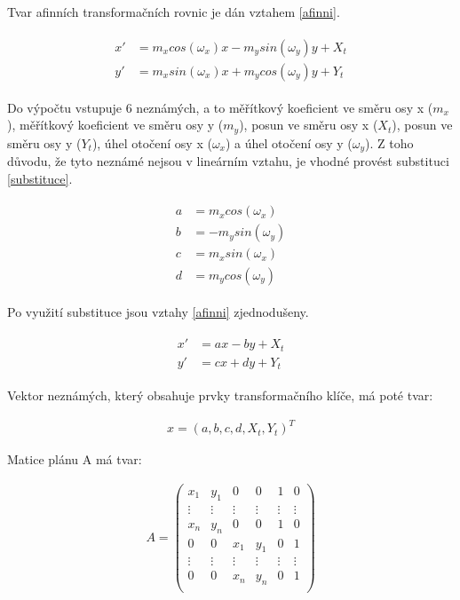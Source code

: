 \documentclass[thesis=M,czech]{FITthesis}[2012/06/26]
\begin{document}
Tvar afinních transformačních rovnic je dán vztahem \eqref{afinni}.

\begin{align}  \label{afinni} 
\begin{split}
x' &= m_x cos(\omega_x) x - m_y sin(\omega_y) y + X_t \\
y' &= m_x sin(\omega_x) x + m_y cos(\omega_y) y + Y_t
\end{split}
\end{align}

Do výpočtu vstupuje 6 neznámých, a to měřítkový koeficient ve směru osy x (\textit{$m_x$}), měřítkový koeficient ve směru osy y (\textit{$m_y$}), posun ve směru osy x (\textit{$X_t$}), posun ve směru osy y (\textit{$Y_t$}), úhel otočení osy x (\textit{$\omega_x$}) a úhel otočení osy y (\textit{$\omega_y$}). Z toho důvodu, že tyto neznámé nejsou v lineárním vztahu, je vhodné provést substituci \eqref{substituce}.

\begin{align}  \label{substituce} 
\begin{split}
a &= m_x cos(\omega_x) \\
b &= - m_y sin(\omega_y) \\
c &= m_x sin(\omega_x)\\
d &= m_y cos(\omega_y)
\end{split}
\end{align}

Po využití substituce jsou vztahy \eqref{afinni} zjednodušeny.

\begin{align}  \label{afinni_sub} 
\begin{split}
x' &= ax - by + X_t \\
y' &= cx + dy + Y_t
\end{split}
\end{align}

Vektor neznámých, který obsahuje prvky transformačního klíče, má poté tvar:

\begin{align} \label{aff_klic}
x = (a, b, c, d, X_t, Y_t)^T
\end{align}

Matice plánu A má tvar:

\begin{align} \label{aff_matA}
A = \begin{pmatrix}
    x_1 & y_1 & 0 & 0 & 1 & 0 \\
    \vdots & \vdots & \vdots & \vdots & \vdots & \vdots \\
    x_n & y_n & 0 & 0 & 1 & 0 \\
    0 & 0 & x_1 & y_1 & 0 & 1 \\
    \vdots & \vdots & \vdots & \vdots & \vdots & \vdots \\
    0 & 0 & x_n & y_n & 0 & 1 \\
\end{pmatrix}
\end{align}
\end{document}
